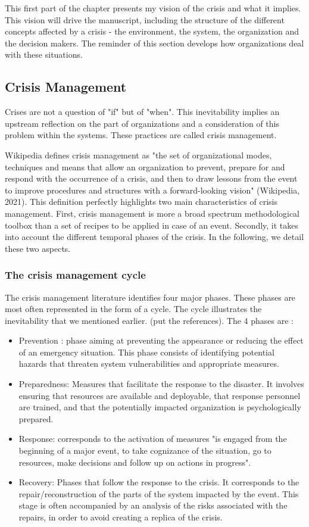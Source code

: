 This first part of the chapter presents my vision of the crisis and what it implies.
This vision will drive the manuscript, including the structure of the different concepts affected by a crisis - the environment, the system, the organization and the decision makers.
The reminder of this section develops how organizations deal with these situations.

\subsection{Crisis Management}
Crises are not a question of "if" but of "when".
This inevitability implies an upstream reflection on the part of organizations and a consideration of this problem within the systems.
These practices are called crisis management.

Wikipedia defines crisis management as "the set of organizational modes, techniques and means that allow an organization to prevent,
prepare for and respond with the occurrence of a crisis, and then to draw lessons from the event to improve procedures and structures
with a forward-looking vision" (Wikipedia, 2021).
This definition perfectly highlights two main characteristics of crisis management.
First, crisis management is more a broad spectrum methodological toolbox than a set of recipes to be applied in case of an event.
Secondly, it takes into account the different temporal phases of the crisis.
In the following, we detail these two aspects.

\subsubsection{The crisis management cycle}
The crisis management literature identifies four major phases.
These phases are most often represented in the form of a cycle.
The cycle illustrates the inevitability that we mentioned earlier. (put the references).
The 4 phases are :

\begin{itemize}
    \item Prevention : phase aiming at preventing the appearance or reducing the effect of an emergency situation.
          This phase consists of identifying potential hazards that threaten system vulnerabilities and appropriate measures.
    \item Preparedness: Measures that facilitate the response to the disaster. It involves ensuring that resources are available and deployable, that response personnel are trained, and that the potentially impacted organization is psychologically prepared.
    \item Response: corresponds to the activation of measures "is engaged from the beginning of a major event, to take cognizance of the situation, go to resources, make decisions
          and follow up on actions in progress".
    \item Recovery: Phases that follow the response to the crisis. It corresponds to the repair/reconstruction of the parts of the system impacted by the event.
          This stage is often accompanied by an analysis of the risks associated with the repairs, in order to avoid creating a replica of the crisis.
\end{itemize}

